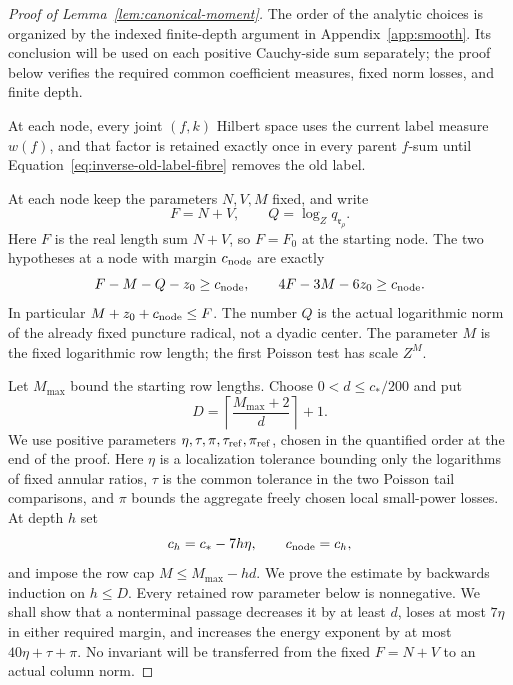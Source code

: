 \documentclass[12pt]{article}
\begin{document}
\begin{proof}[Proof of Lemma~\ref{lem:canonical-moment}]
The order of the analytic choices is organized by
the indexed finite-depth argument in Appendix~\ref{app:smooth}.
Its conclusion will be
used on each positive Cauchy-side sum separately; the proof below verifies
the required common coefficient measures, fixed norm losses, and finite depth.

At each node, every joint \((f,k)\) Hilbert space uses the current label
measure \(w(f)\), and that factor is retained exactly once in every
parent \(f\)-sum until Equation~\eqref{eq:inverse-old-label-fibre}
removes the old label.

At each node keep the parameters \(N,V,M\) fixed, and write
\[
 F=N+V,\qquad Q=\log_Zq_{\mathfrak r_\rho}.
\]
Here \(F\) is the real length sum \(N+V\), so \(F=F_0\) at the starting
node.  The two hypotheses at a node with margin \(c_{\rm node}\) are exactly
\begin{equation}\label{eq:inverse-fixed-invariant}
 F-M-Q-z_0\ge c_{\rm node},\qquad
 4F-3M-6z_0\ge c_{\rm node}.
\end{equation}
In particular \(M+z_0+c_{\rm node}\le F\).  The number \(Q\) is the
actual logarithmic norm of the already fixed puncture radical, not a
dyadic center.  The parameter \(M\) is the fixed logarithmic row length;
the first Poisson test has scale \(Z^M\).

Let \(M_{\max}\) bound the starting row lengths.  Choose
\(0<d\le c_*/200\) and put
\[
 D=\left\lceil\frac{M_{\max}+2}{d}\right\rceil+1.
\]
We use positive parameters \(\eta,\tau,\pi,\tau_{\rm ref},\pi_{\rm ref}\),
chosen in the quantified order at the end of the proof.  Here \(\eta\)
is a localization tolerance bounding only the logarithms of fixed annular
ratios, \(\tau\) is the common tolerance in the two Poisson tail comparisons,
and \(\pi\) bounds the aggregate freely chosen local small-power losses.  At depth
\(h\) set
\[
 c_h=c_*-7h\eta,\qquad c_{\rm node}=c_h,
\]
and impose the row cap \(M\le M_{\max}-hd\).  We prove the estimate by
backwards induction on \(h\le D\).  Every retained row parameter below
is nonnegative.  We shall show that a nonterminal passage decreases it
by at least \(d\), loses at most \(7\eta\) in either required margin,
and increases the energy exponent by at most \(40\eta+\tau+\pi\).
No invariant will be transferred from the fixed \(F=N+V\) to an
actual column norm.


\end{proof}
\end{document}
